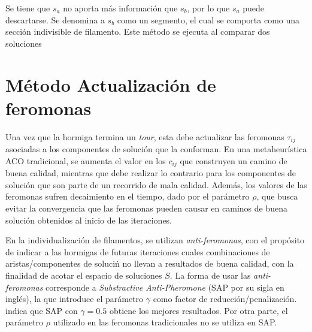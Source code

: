 Se tiene que $s_a$ no aporta m\'as informaci\'on que $s_b$, por lo que $s_a$ puede descartarse. Se denomina a $s_b$ como un segmento, el cual se comporta como una secci\'on indivisible de filamento. Este m\'etodo se ejecuta al comparar dos soluciones 

    
\section{M\'etodo Actualizaci\'on de feromonas}
\label{subsec:pheroUpdate}
Una vez que la hormiga termina un {\it tour}, esta debe actualizar las feromonas $\tau_{ij}$ asociadas a los componentes de soluci\'on que la conforman. En una metaheur\'istica ACO tradicional, se aumenta el valor en los $c_{ij}$ que construyen un camino de buena calidad, mientras que debe realizar lo contrario para los componentes de soluci\'on que son parte de un recorrido de mala calidad. Adem\'as, los valores de las feromonas sufren decaimiento en el tiempo, dado por el par\'ametro $\rho$, que busca evitar la convergencia que las feromonas pueden causar en caminos de buena soluci\'on obtenidos al inicio de las iteraciones.


En la individualizaci\'on de filamentos, se utilizan {\it anti-feromonas}, con el prop\'osito de indicar a las hormigas de futuras iteraciones cuales combinaciones de aristas/componentes de soluci\'n no llevan a resultados de buena calidad, con la finalidad de acotar el espacio de soluciones $S$. La forma de usar las {\it anti-feromonas} corresponde a {\it Substractive Anti-Pheromone} (SAP por su sigla en ingl\'es), la que introduce el par\'ametro $\gamma$ como factor de reducci\'on/penalizaci\'on. \cite{montgomery2002anti} indica que SAP con $\gamma = 0.5$ obtiene los mejores resultados. Por otra parte, el par\'ametro $\rho$ utilizado en las feromonas tradicionales no se utiliza en SAP.


